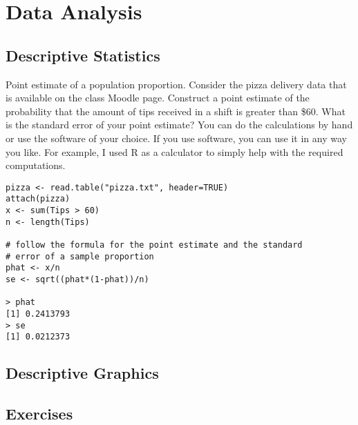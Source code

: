 \chapter{Data Analysis}
\label{data-analysis}


\section{Descriptive Statistics}

Point estimate of a population proportion. Consider the
  pizza delivery data that is available on the class Moodle
  page. Construct a point estimate of the probability that the amount
  of tips received in a shift is greater than \$60. What is the
  standard error of your point estimate? You can do the calculations
  by hand or use the software of your choice. If you use software, you
  can use it in any way you like.  For example, I used R as a
  calculator to simply help with the required computations.
  
\begin{Verbatim}
pizza <- read.table("pizza.txt", header=TRUE)
attach(pizza)
x <- sum(Tips > 60)
n <- length(Tips)

# follow the formula for the point estimate and the standard
# error of a sample proportion
phat <- x/n
se <- sqrt((phat*(1-phat))/n)

> phat
[1] 0.2413793
> se
[1] 0.0212373
\end{Verbatim}


\section{Descriptive Graphics}

\section{Exercises}

